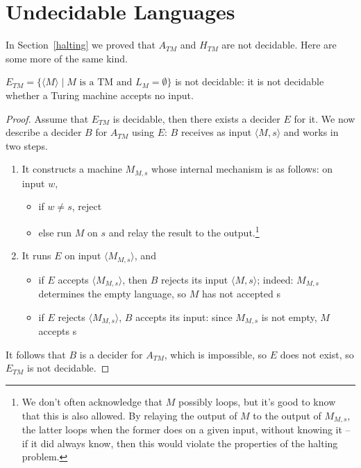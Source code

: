 
\section{Undecidable Languages}

In Section~\ref{halting} we proved that $A_{TM}$ and $H_{TM}$ are not
decidable. Here are some more of the same kind.

\begin{theorem} \label{nonreductie1}
$E_{TM} = \{\langle M \rangle \mid \text{$M$ is a TM and $L_M = \emptyset$}\}$ is not
     decidable: it is not decidable whether a Turing machine accepts
     no input.
\end{theorem}
\begin{proof}
Assume that $E_{TM}$ is decidable, then there exists a decider $E$ for
it. We now describe a decider $B$ for $A_{TM}$ using $E$:
$B$ receives as input $\langle M,s \rangle$ and works in two steps.
\begin{enumerate}
	\item It constructs a machine $M_{M,s}$ whose internal mechanism is as follows: on input
	$w$,
	\begin{itemize}
		\item if $w \neq s$, reject
		\item else run $M$ on $s$ and relay the result to the output.\footnote{We don't often acknowledge that $M$ possibly loops, but it's good to know that this is also allowed. By relaying the output of $M$ to the output of $M_{M,s}$, the latter loops when the former does on a given input, without knowing it -- if it did always know, then this would violate the properties of the halting problem.}
	\end{itemize}
	
	\item It runs $E$ on input $\langle M_{M,s} \rangle$, and
	\begin{itemize}
		\item if $E$ accepts $\langle M_{M,s} \rangle$, then $B$ rejects its
		  input $\langle M,s \rangle$; indeed: $M_{M,s}$ determines the empty
		  language, so $M$ has not accepted s
		\item if $E$ rejects $\langle M_{M,s} \rangle$, $B$ accepts its input: since  $M_{M,s}$ is not empty, $M$ accepts s
	\end{itemize}
\end{enumerate}
It follows that $B$ is a decider for $A_{TM}$, which is impossible, so
$E$ does not exist, so $E_{TM}$ is not decidable.
\end{proof}

